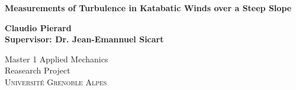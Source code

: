 
\begin{titlepage}
	
	
	\thispagestyle{frontpage}
	
	\begin{center}
		
		\vspace*{8\baselineskip}
	
		
		{\Huge \textbf{Measurements of Turbulence in Katabatic Winds over a Steep Slope\\}}
		
		
        \vspace*{1,5\baselineskip}

		\large{\textbf{Claudio Pierard}}\\
		\large{\textbf{Supervisor: Dr. Jean-Emannuel Sicart}}\\
		
		\vspace{1,5\baselineskip}
		
		\large{Master 1 Applied Mechanics}\\
		\large{Reasearch Project}\\
		
		\vspace{1,5\baselineskip}
		\large{\scshape Universit\'e Grenoble Alpes}\\

	\end{center}
	
\end{titlepage}